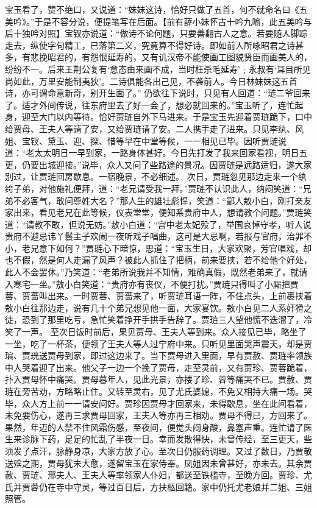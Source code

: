 \documentclass[12pt,oneside]{book}
\begin{document}
宝玉看了，赞不绝口，又说道：“妹妹这诗，恰好只做了五首，何不就命名曰《五美吟》。”于是不容分说，便提笔写在后面。【前有薛小妹怀古十吟九喻，此五美吟与后十独吟对照】宝钗亦说道：“做诗不论何题，只要善翻古人之意。若要随人脚踪走去，纵使字句精工，已落第二义，究竟算不得好诗。即如前人所咏昭君之诗甚多，有悲挽昭君的，有怨恨延寿的，又有讥汉帝不能使画工图貌贤臣而画美人的，纷纷不一。后来王荆公复有‘意态由来画不成，当时枉杀毛延寿’﹔永叔有‘耳目所见尚如此，万里安能制夷狄’。二诗俱能各出己见，不袭前人。今日林妹妹这五首诗，亦可谓命意新奇，别开生面了。”
仍欲往下说时，只见有人回道：“琏二爷回来了。适才外间传说，往东府里去了好一会了，想必就回来的。”宝玉听了，连忙起身，迎至大门以内等待。恰好贾琏自外下马进来。于是宝玉先迎着贾琏跪下，口中给贾母、王夫人等请了安，又给贾琏请了安。二人携手走了进来。只见李纨、风姐、宝钗、黛玉、迎、探、惜等早在中堂等候，一一相见已毕。因听贾琏说道：“老太太明日一早到家，一路身体甚好。今日先打发了我来回家看视，明日五更，仍要出城迎接。”说毕，众人又问了些路途的景况。因贾琏是远路适归，遂大家别过，让贾琏回房歇息。一宿晚景，不必细述。
次日，贾琏忽见那边走来一个纨绔子弟，对他施礼便拜，道：“老兄请受我一拜。”贾琏不认识此人，纳闷笑道：“兄弟不必客气，敢问尊姓大名？”那人生的雄壮彪悍，笑道：“鄙人敖小白，刚打亲友家出来，看见老兄在此等候，仪表堂堂，便知系贵府中人，想请教个问题。”贾琏笑道：“请教不敢，但说无妨。”敖小白道：“宫中老太妃殁了，举国哀悼守孝，听人说贵府不避忌讳丫鬟主子欢闹一夜听戏子唱曲，这可是大忌啊，若报与官府，治罪不小，老兄意下如何？”贾琏心下暗惊，思道：“宝玉生日，大家欢聚，芳官唱戏，却也不假，然是何人走漏了风声？被此人抓住了把柄，前来要挟，若不给他个好处，此人不会罢休。”乃笑道：“老弟所说我并不知情，难确真假，既然老弟来了，就请入寒宅一坐。”敖小白笑道：“贵府亦有丧仪，不便打扰。”贾琏只得叫了小厮把贾蓉、贾蔷叫出来。一时贾蓉、贾蔷来了，听贾琏耳语一阵，不住点头，上前裹挟着敖小白往那边走，说有几十个弟兄想见他一面，大家宴饮。敖小白见二人系奸猾之徒，恐到了那里吃亏，急忙笑着挣开手拱手告辞了。贾琏三人望他慌不迭溜了，冷笑了一声。
至次日饭时前后，果见贾母、王夫人等到来。众人接见已毕，略坐了一坐，吃了一杯茶，便领了王夫人等人过宁府中来。只听见里面哭声震天，却是贾㻞、贾珖送贾母到家，即过这边来了。当下贾母进入里面，早有贾赦、贾琏率领族中人哭着迎了出来。他父子一边一个挽了贾母，走至灵前，又有贾珍、贾蓉跪着，扑入贾母怀中痛哭。贾母暮年人，见此光景，亦搂了珍、蓉等痛哭不已。贾赦、贾琏在旁苦劝，方略略止住。又转至灵右，见了尤氏婆媳，不免又相持大痛一场。哭毕，众人方上前一一请安问好。贾珍因贾母才回家来，未得歇息，坐在此间看着，未免要伤心，遂再三求贾母回家，王夫人等亦再三相劝。贾母不得已，方回来了。
果然，年迈的人禁不住风霜伤感，至夜间，便觉头闷身酸，鼻塞声重。连忙请了医生来诊脉下药，足足的忙乱了半夜一日。幸而发散得快，未曾传经，至三更天，些须发了点汗，脉静身凉，大家方放了心。至次日仍服药调理。又过了数日，乃贾敬送殡之期，贾母犹未大愈，遂留宝玉在家侍奉。凤姐因未曾甚好，亦未去。其余贾赦、贾琏、邢夫人、王夫人等率领家人仆妇，都送至铁槛寺，至晚方回。贾珍、尤氏并贾蓉仍在寺中守灵，等过百日后，方扶柩回籍。家中仍托尤老娘并二姐、三姐照管。
\end{document}
